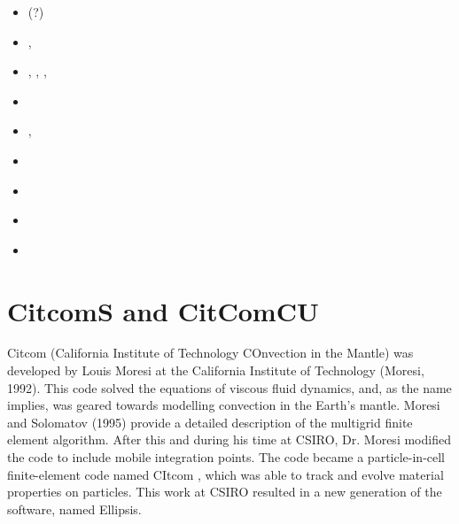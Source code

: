 \begin{small}
\begin{itemize}
\item[\nineteenninetytwo]     \textcite{baho92}(?)
\item[\nineteenninetysix]     \textcite{baho96},  \textcite{hoen96}
\item[\nineteenninetyseven]   \textcite{hogu97},  \textcite{homo97},
                              \textcite{bobt97},  \textcite{neho97}
\item[\twothousand]           \textcite{honk00}
\item[\twothousandone]        \textcite{tesb01},  \textcite{jebe01}
\item[\twothousandeight]      \textcite{bokj08}
\item[\twothousandseventeen]  \textcite{waeh17}
\item[\twothousandnineteen]   \textcite{llor19}
\item[\twothousandtwentyfive] \textcite{hoee25}
\end{itemize}
\end{small}



\section{CitcomS and CitComCU} 

Citcom (California Institute of Technology COnvection in the Mantle) was  
developed by Louis Moresi at the California Institute of Technology (Moresi, 1992). 
This code solved the equations of viscous fluid dynamics, and, as the name implies, 
was geared towards modelling convection in the Earth's mantle. Moresi and 
Solomatov (1995) provide a detailed description of the multigrid
finite element algorithm. After this and during his time at CSIRO, Dr. Moresi 
modified the code to include mobile integration points. The code became a 
particle-in-cell finite-element code named CItcom , which was able to track 
and evolve material properties on particles. This work at
CSIRO resulted in a new generation of the software, named Ellipsis.

